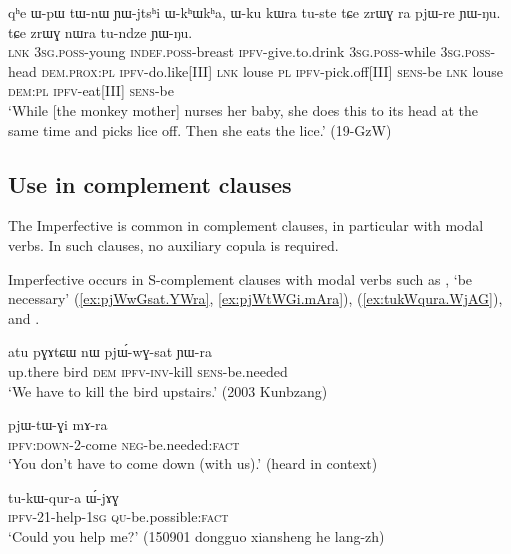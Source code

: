 \begin{exe}
\ex \label{ex:YWjtshi.WkhWkha}
\gll qʰe ɯ-pɯ tɯ-nɯ ɲɯ-jtsʰi ɯ-kʰɯkʰa,  ɯ-ku kɯra tu-ste tɕe zrɯɣ ra pjɯ-re ɲɯ-ŋu.  tɕe zrɯɣ nɯra tu-ndze ɲɯ-ŋu. \\
\textsc{lnk} \textsc{3sg}.\textsc{poss}-young \textsc{indef}.\textsc{poss}-breast \textsc{ipfv}-give.to.drink \textsc{3sg}.\textsc{poss}-while \textsc{3sg}.\textsc{poss}-head \textsc{dem}.\textsc{prox}:\textsc{pl} \textsc{ipfv}-do.like[III] \textsc{lnk} louse \textsc{pl} \textsc{ipfv}-pick.off[III] \textsc{sens}-be \textsc{lnk} louse \textsc{dem}:\textsc{pl} \textsc{ipfv}-eat[III] \textsc{sens}-be \\
\glt `While [the monkey mother] nurses her baby, she does this to its head at the same time and picks lice off. Then she eats the lice.' (19-GzW)
\end{exe}

\subsection{Use in complement clauses} \label{sec:ipfv.complement}
The Imperfective is common in complement clauses, in particular with modal verbs. In such clauses, no auxiliary copula is required.

Imperfective occurs in S-complement clauses with modal verbs such as , `be necessary' (\ref{ex:pjWwGsat.YWra}, \ref{ex:pjWtWGi.mAra}),  (\ref{ex:tukWqura.WjAG}),  and . 

\begin{exe}
\ex \label{ex:pjWwGsat.YWra}
\gll  atu pɣɤtɕɯ nɯ pjɯ́-wɣ-sat ɲɯ-ra \\
up.there bird \textsc{dem} \textsc{ipfv}-\textsc{inv}-kill \textsc{sens}-be.needed \\
\glt `We have to kill the bird upstairs.' (2003 Kunbzang)
\end{exe}

\begin{exe}
\ex \label{ex:pjWtWGi.mAra}
\gll pjɯ-tɯ-ɣi mɤ-ra \\
\textsc{ipfv}:\textsc{down}-2-come \textsc{neg}-be.needed:\textsc{fact} \\
\glt `You don't have to come down (with us).' (heard in context)
\end{exe}

\begin{exe}
\ex \label{ex:tukWqura.WjAG}
\gll tu-kɯ-qur-a ɯ́-jɤɣ \\
\textsc{ipfv}-2\fl{}1-help-\textsc{1sg} \textsc{qu}-be.possible:\textsc{fact} \\
\glt `Could you help me?' (150901 dongguo xiansheng he lang-zh)
\end{exe}

